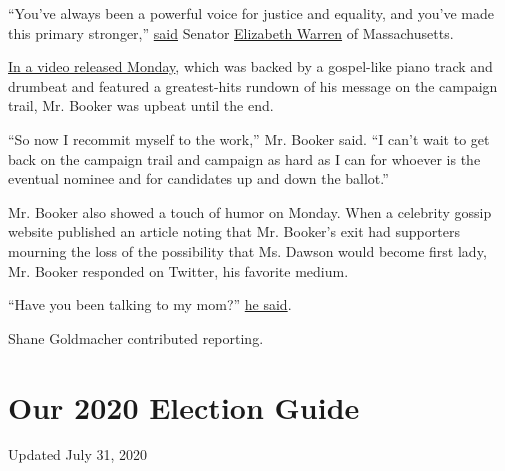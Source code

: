 ``You've always been a powerful voice for justice and equality, and
you've made this primary stronger,''
\href{https://twitter.com/ewarren/status/1216760444951678977}{said}
Senator
\href{https://www.nytimes.com/interactive/2020/us/elections/elizabeth-warren.html}{Elizabeth
Warren} of Massachusetts.

\href{https://www.youtube.com/watch?v=VP6mNrhIBs8\&feature=emb_logo}{In
a video released Monday}, which was backed by a gospel-like piano track
and drumbeat and featured a greatest-hits rundown of his message on the
campaign trail, Mr. Booker was upbeat until the end.

``So now I recommit myself to the work,'' Mr. Booker said. ``I can't
wait to get back on the campaign trail and campaign as hard as I can for
whoever is the eventual nominee and for candidates up and down the
ballot.''

Mr. Booker also showed a touch of humor on Monday. When a celebrity
gossip website published an article noting that Mr. Booker's exit had
supporters mourning the loss of the possibility that Ms. Dawson would
become first lady, Mr. Booker responded on Twitter, his favorite medium.

``Have you been talking to my mom?''
\href{https://twitter.com/CoryBooker/status/1216776260371828736}{he
said}.

Shane Goldmacher contributed reporting.

\hypertarget{our-2020-election-guide}{%
\section{Our 2020 Election Guide}\label{our-2020-election-guide}}

Updated July 31, 2020

